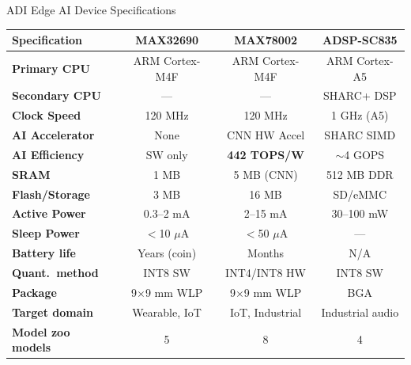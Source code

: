 \documentclass[aspectratio=169]{beamer}
\begin{document}
\begin{frame}{ADI Edge AI Device Specifications}
\small
\begin{tabular}{lccc}
\toprule
\textbf{Specification} & \textbf{MAX32690} & \textbf{MAX78002} & \textbf{ADSP-SC835}\\
\midrule
\textbf{Primary CPU} & ARM Cortex-M4F & ARM Cortex-M4F & ARM Cortex-A5\\
\textbf{Secondary CPU} & --- & --- & SHARC+ DSP\\
\textbf{Clock Speed} & 120 MHz & 120 MHz & 1 GHz (A5)\\
\textbf{AI Accelerator} & None & CNN HW Accel & SHARC SIMD\\
\textbf{AI Efficiency} & SW only & \textbf{442 TOPS/W} & $\sim$4 GOPS\\
\textbf{SRAM} & 1 MB & 5 MB (CNN) & 512 MB DDR\\
\textbf{Flash/Storage} & 3 MB & 16 MB & SD/eMMC\\
\textbf{Active Power} & 0.3--2 mA & 2--15 mA & 30--100 mW\\
\textbf{Sleep Power} & $<$10 $\mu$A & $<$50 $\mu$A & ---\\
\textbf{Battery life} & Years (coin) & Months & N/A\\
\textbf{Quant.\ method} & INT8 SW & INT4/INT8 HW & INT8 SW\\
\textbf{Package} & 9$\times$9 mm WLP & 9$\times$9 mm WLP & BGA\\
\textbf{Target domain} & Wearable, IoT & IoT, Industrial & Industrial audio\\
\midrule
\textbf{Model zoo models} & 5 & 8 & 4\\
\bottomrule
\end{tabular}
\end{frame}
\end{document}
